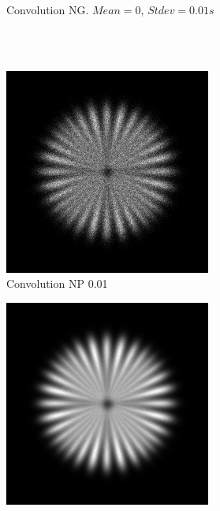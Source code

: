 \documentclass{./packages/optica-article}
\begin{document}
\begin{figure}[hbp]
\begin{center}
\begin{subfigure}[t]{0.25\textwidth}
			\caption{Convolution NG. $Mean=0$, $Stdev=0.01s$}\label{fig:sim:ng0.01}
		\end{subfigure}
		\hfill\,
		\\
		\hfill\,
		\begin{subfigure}[t]{0.25\textwidth}\centering
			\centering
			\includegraphics[width=\textwidth]{Simulation deconvolution/ref_np_0.01}
			\caption{Convolution NP 0.01}\label{fig:sim:np0.01}
		\end{subfigure}
		\hfill
		\begin{subfigure}[t]{0.25\textwidth}\centering
			\centering
			\includegraphics[width=\textwidth]{Simulation deconvolution/ref_np_0.0001}

\end{subfigure}
\end{center}
\end{figure}
\end{document}
